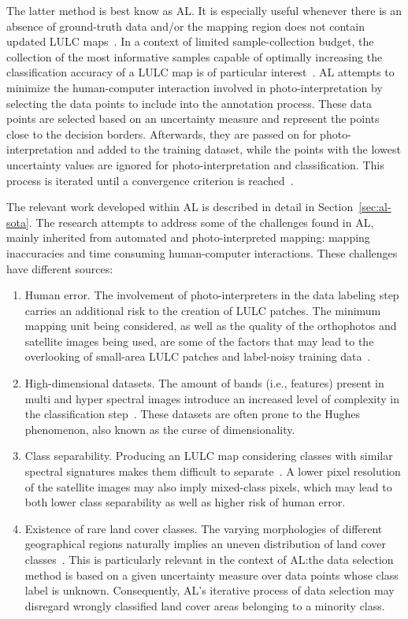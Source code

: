 \documentclass[parskip=full]{scrartcl}
\begin{document}
The latter method is best know as AL\@. It is especially useful whenever there
is an absence of ground-truth data and/or the mapping region does not contain
updated LULC maps~\cite{Su2020}. In a context of limited sample-collection
budget, the collection of the most informative samples capable of optimally
increasing the classification accuracy of a LULC map is of particular
interest~\cite{Su2020}. AL attempts to minimize the human-computer interaction
involved in photo-interpretation by selecting the data points to include into
the annotation process. These data points are selected based on an uncertainty
measure and represent the points close to the decision borders. Afterwards,
they are passed on for photo-interpretation and added to the training dataset,
while the points with the lowest uncertainty values are ignored for
photo-interpretation and classification. This process is iterated until a
convergence criterion is reached~\cite{Pasolli2016}. 

The relevant work developed within AL is described in detail in
Section~\ref{sec:al-sota}. The research attempts to address some of the
challenges found in AL, mainly inherited from automated and photo-interpreted
mapping: mapping inaccuracies and time consuming human-computer interactions.
These challenges have different sources:

\begin{enumerate}
    \item Human error. The involvement of photo-interpreters in the data
        labeling step carries an additional risk to the creation of LULC
        patches. The minimum mapping unit being considered, as well as the
        quality of the orthophotos and satellite images being used, are some of
        the factors that may lead to the overlooking of small-area LULC patches
        and label-noisy training data~\cite{Pelletier2017}.
    \item High-dimensional datasets. The amount of bands (i.e., features)
        present in multi and hyper spectral images introduce an increased level
        of complexity in the classification step~\cite{Stromann2020}. These
        datasets are often prone to the Hughes phenomenon, also known as the
        curse of dimensionality. 
    \item Class separability. Producing an LULC map considering classes with
        similar spectral signatures makes them difficult to
        separate~\cite{Alonso-Sarria2019}. A lower pixel resolution of the
        satellite images may also imply mixed-class pixels, which may lead to
        both lower class separability as well as higher risk of human error.
    \item Existence of rare land cover classes. The varying morphologies of
        different geographical regions naturally implies an uneven distribution
        of land cover classes~\cite{Feng2018}. This is particularly relevant in
        the context of AL:\@ the data selection method is based on a given
        uncertainty measure over data points whose class label is unknown.
        Consequently, AL's iterative process of data selection may disregard
        wrongly classified land cover areas belonging to a minority class.
\end{enumerate}
\end{document}
